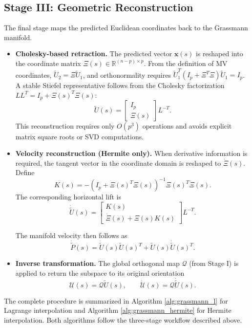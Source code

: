 \documentclass[11pt]{article}
\begin{document}
\subsection{Stage III: Geometric Reconstruction}

The final stage maps the predicted Euclidean coordinates back to the Grassmann manifold.

\begin{itemize}
    \item \textbf{Cholesky-based retraction.} The predicted vector $\mathbf{x}(s)$ is reshaped into the coordinate matrix $\Xi(s) \in \mathbb{R}^{(n-p)\times p}$. From the definition of MV coordinates, $\widetilde U_2 = \Xi \widetilde U_1$, and orthonormality requires $\widetilde U_1^T(I_p + \Xi^T\Xi)\widetilde U_1 = I_p$. A stable Stiefel representative follows from the Cholesky factorization $LL^T = I_p + \Xi(s)^T\Xi(s)$:
 $$
        \widetilde U(s) = \begin{bmatrix} I_p \\ \Xi(s) \end{bmatrix} L^{-T}.
 $$
    This reconstruction requires only $O(p^3)$ operations and avoids explicit matrix square roots or SVD computations.

    \item \textbf{Velocity reconstruction (Hermite only).} When derivative information is required, the tangent vector in the coordinate domain is reshaped to $\dot{\Xi}(s)$. Define
$$
    K(s)=-(I_p+\Xi(s)^T\Xi(s))^{-1}\Xi(s)^T\dot{\Xi}(s).
$$
The corresponding horizontal lift is
$$
    \dot{\widetilde U}(s)=
    \begin{bmatrix}
        K(s) \\
        \dot{\Xi}(s)+\Xi(s)K(s)
    \end{bmatrix}
    L^{-T}.
$$

The manifold velocity then follows as
$$
    \dot{\widetilde P}(s)=\dot{\widetilde U}(s)\widetilde U(s)^T+\widetilde U(s)\dot{\widetilde U}(s)^T.
$$

    \item \textbf{Inverse transformation.} The global orthogonal map $\mathcal{Q}$ (from Stage I) is applied to return the subspace to its original orientation
 $$
        \mathcal{U}(s) = \mathcal{Q} \widetilde U(s), \qquad \dot{\mathcal{U}}(s) = \mathcal{Q} \dot{\widetilde U}(s).
 $$
\end{itemize}

The complete procedure is summarized in Algorithm \ref{alg:grassmann_l} for Lagrange interpolation and Algorithm \ref{alg:grassmann_hermite} for Hermite interpolation. Both algorithms follow the three-stage workflow described above.
 
\end{document}
